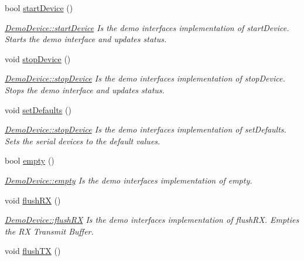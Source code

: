 \begin{DoxyCompactItemize}
bool \hyperlink{class_demo_device_af350ecf6ff289983cff9053197f1b1f2}{start\+Device} ()
\begin{DoxyCompactList}\small\item\em \hyperlink{class_demo_device_af350ecf6ff289983cff9053197f1b1f2}{Demo\+Device\+::start\+Device} Is the demo interface\textquotesingle{}s implementation of start\+Device. Starts the demo interface and updates status. \end{DoxyCompactList}\item 
void \hyperlink{class_demo_device_ab95434f7121f00789108f29a8457ec98}{stop\+Device} ()
\begin{DoxyCompactList}\small\item\em \hyperlink{class_demo_device_ab95434f7121f00789108f29a8457ec98}{Demo\+Device\+::stop\+Device} Is the demo interface\textquotesingle{}s implementation of stop\+Device. Stops the demo interface and updates status. \end{DoxyCompactList}\item 
void \hyperlink{class_demo_device_a79a9c22e60aca99c7667990bedc461c8}{set\+Defaults} ()
\begin{DoxyCompactList}\small\item\em \hyperlink{class_demo_device_ab95434f7121f00789108f29a8457ec98}{Demo\+Device\+::stop\+Device} Is the demo interface\textquotesingle{}s implementation of set\+Defaults. Sets the serial devices to the default values. \end{DoxyCompactList}\item 
bool \hyperlink{class_demo_device_a52de363ec31fdbb540cf7cae6f584d22}{empty} ()
\begin{DoxyCompactList}\small\item\em \hyperlink{class_demo_device_a52de363ec31fdbb540cf7cae6f584d22}{Demo\+Device\+::empty} Is the demo interface\textquotesingle{}s implementation of empty. \end{DoxyCompactList}\item 
void \hyperlink{class_demo_device_abd7460c71a01d986b1f77908ccb779a2}{flush\+RX} ()
\begin{DoxyCompactList}\small\item\em \hyperlink{class_demo_device_abd7460c71a01d986b1f77908ccb779a2}{Demo\+Device\+::flush\+RX} Is the demo interface\textquotesingle{}s implementation of flush\+RX. Empties the RX Transmit Buffer. \end{DoxyCompactList}\item 
void \hyperlink{class_demo_device_a32e89c17f613abfa7f2a4d9f970bbffe}{flush\+TX} ()

\end{DoxyCompactItemize}
